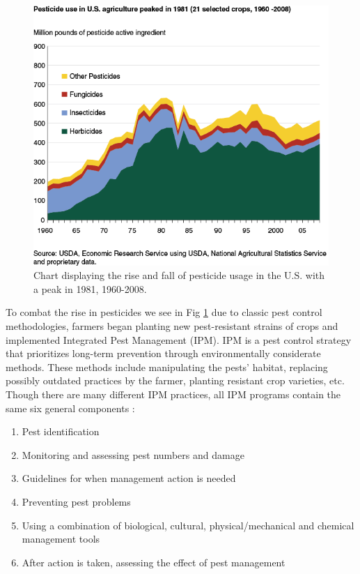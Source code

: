 \begin{figure}[H]
\begin{center}
\includegraphics[width=0.9\linewidth]{Honors_Thesis/Figures/1.2.png}
\end{center}
\caption{Chart displaying the rise and fall of pesticide usage in the U.S. with a peak in 1981, 1960-2008.}
\label{fig:1.2}
\end{figure}

To combat the rise in pesticides we see in Fig \ref{fig:1.2} due to classic pest control methodologies, farmers began planting new pest-resistant strains of crops and implemented Integrated Pest Management (IPM). IPM is a pest control strategy that prioritizes long-term prevention through environmentally considerate methods. These methods include manipulating the pests' habitat, replacing possibly outdated practices by the farmer, planting resistant crop varieties, etc. Though there are many different IPM practices, all IPM programs contain the same six general components \cite{ipm}:

\begin{displayquote}
\begin{enumerate}
   \item Pest identification
   \item Monitoring and assessing pest numbers and damage
   \item Guidelines for when management action is needed
   \item Preventing pest problems
   \item Using a combination of biological, cultural, physical/mechanical and chemical management tools
   \item After action is taken, assessing the effect of pest management 
\end{enumerate}
\end{displayquote}

